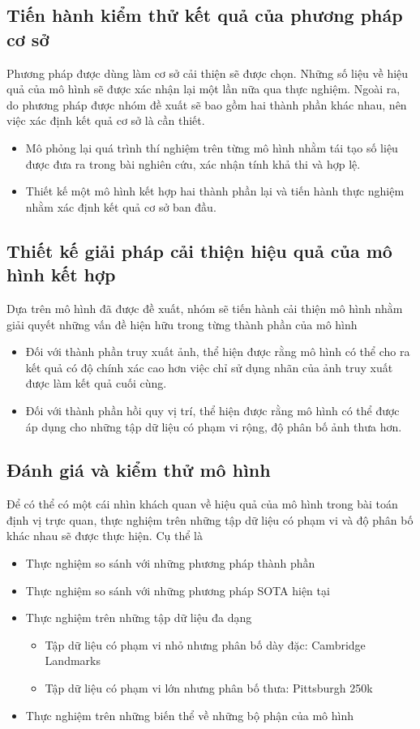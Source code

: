 \subsection{Tiến hành kiểm thử kết quả của phương pháp cơ sở}
Phương pháp được dùng làm cơ sở cải thiện sẽ được chọn. Những số liệu về hiệu quả của mô hình sẽ được xác nhận lại một lần nữa qua thực nghiệm. Ngoài ra, do phương pháp được nhóm đề xuất sẽ bao gồm hai thành phần khác nhau, nên việc xác định kết quả cơ sở là cần thiết.
\begin{itemize}
    \item Mô phỏng lại quá trình thí nghiệm trên từng mô hình nhằm tái tạo số liệu được đưa ra trong bài nghiên cứu, xác nhận tính khả thi và hợp lệ.
    \item Thiết kế một mô hình kết hợp hai thành phần lại và tiến hành thực nghiệm nhằm xác định kết quả cơ sở ban đầu.
\end{itemize}

\subsection{Thiết kế giải pháp cải thiện hiệu quả của mô hình kết hợp}
Dựa trên mô hình đã được đề xuất, nhóm sẽ tiến hành cải thiện mô hình nhằm giải quyết những vấn đề hiện hữu trong từng thành phần của mô hình
\begin{itemize}
    \item Đối với thành phần truy xuất ảnh, thể hiện được rằng mô hình có thể cho ra kết quả có độ chính xác cao hơn việc chỉ sử dụng nhãn của ảnh truy xuất được làm kết quả cuối cùng.
    \item Đối với thành phần hồi quy vị trí, thể hiện được rằng mô hình có thể được áp dụng cho những tập dữ liệu có phạm vi rộng, độ phân bố ảnh thưa hơn.
\end{itemize}

\subsection{Đánh giá và kiểm thử mô hình}
Để có thể có một cái nhìn khách quan về hiệu quả của mô hình trong bài toán định vị trực quan, thực nghiệm trên những tập dữ liệu có phạm vi và độ phân bố khác nhau sẽ được thực hiện. Cụ thể là

\begin{itemize}
    \item Thực nghiệm so sánh với những phương pháp thành phần
    \item Thực nghiệm so sánh với những phương pháp SOTA hiện tại
    \item Thực nghiệm trên những tập dữ liệu đa dạng
    \begin{itemize}
        \item Tập dữ liệu có phạm vi nhỏ nhưng phân bố dày đặc: Cambridge Landmarks
        \item Tập dữ liệu có phạm vi lớn nhưng phân bố thưa: Pittsburgh 250k
    \end{itemize}
    \item Thực nghiệm trên những biến thể về những bộ phận của mô hình
\end{itemize}

